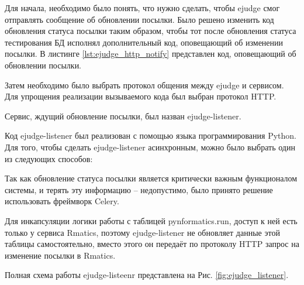 \label{lab:ejudge_listener}
Для начала, необходимо было понять, что нужно сделать, 
чтобы ejudge смог отправлять сообщение об обновлении посылки.
Было решено изменить код обновления статуса посылки таким образом, 
чтобы тот после обновления статуса тестирования БД исполнял дополнительный код,
оповещающий об изменении посылки. В листинге \ref{lst:ejudge_http_notify} представлен код, оповещающий об обновлении посылки.

Затем необходимо было выбрать протокол общения между ejudge и сервисом.
Для упрощения реализации вызываемого кода был выбран протокол HTTP.

Сервис, ждущий обновление посылки, был назван ejudge-listener.



Код ejudge-listener был реализован с помощью языка программирования Python.
Для того, чтобы сделать ejudge-listener асинхронным, можно было выбрать один из следующих способов: 


Так как обновление статуса посылки является критически важным функционалом системы,
и терять эту информацию -- недопустимо, было принято решение использовать фреймворк Celery.

Для инкапсуляции логики работы с таблицей pynformatics.run, 
доступ к ней есть только у сервиса Rmatics, 
поэтому ejudge-listener не обновляет данные этой таблицы самостоятельно,
вместо этого он передаёт по протоколу HTTP запрос на изменение посылки в Rmatics.

Полная схема работы ejudge-listeenr представлена на Рис. \ref{fig:ejudge_listener}.

